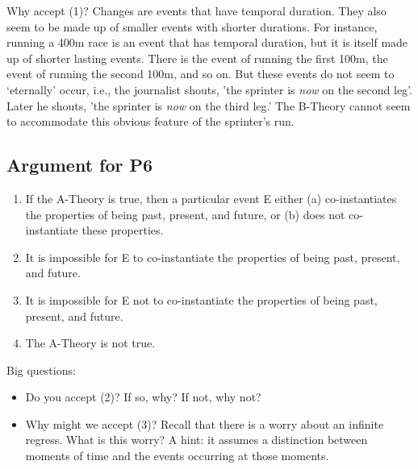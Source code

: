 \documentclass[oneside]{article}
\begin{document}
Why accept (1)?  Changes are events that have temporal duration. They also seem to be made up of smaller events with shorter durations. For instance, running a 400m race is an event that has temporal duration, but it is itself made up of shorter lasting events. There is the event of running the first 100m, the event of running the second 100m, and so on. But these events do not seem to `eternally' occur, i.e., the journalist shouts, 'the sprinter is \emph{now} on the second leg'. Later he shouts, 'the sprinter is \emph{now} on the third leg.'  The B-Theory cannot seem to accommodate this obvious feature of the sprinter's run. 
 

\subsection*{Argument for P6}

\begin{enumerate}
\item If the A-Theory is true, then a particular event E either (a) co-instantiates the properties of being past, present, and future, or (b) does not co-instantiate these properties. 
\item It is impossible for E to co-instantiate the properties of being past, present, and future.
\item It is impossible for E not to co-instantiate the properties of being past, present, and future. 
\item The A-Theory is not true. 
\end{enumerate}
Big questions:
\begin{itemize}
\item Do you accept (2)? If so, why? If not, why not? 
\item Why might we accept (3)? Recall that there is a worry about an infinite regress. What is this worry? A hint: it assumes a distinction between moments of time and the events occurring at those moments.
\end{itemize}
\end{document}
